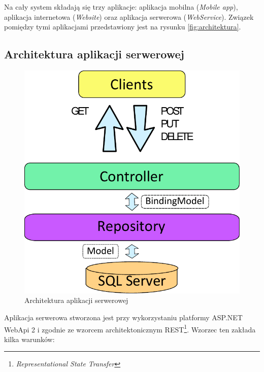 \documentclass{book}
\begin{document}
		Na cały system składają się trzy aplikacje: aplikacja mobilna (\emph{Mobile app}), aplikacja internetowa (\emph{Website}) oraz aplikacja serwerowa (\emph{WebService}). Związek pomiędzy tymi aplikacjami przedstawiony jest na rysunku \ref{fig:architektura}. 
			
			\subsection{Architektura aplikacji serwerowej}
			
			\begin{figure}
				\centering
				\includegraphics[width=1\textwidth]{images/architektura_server.pdf}
				\caption{Architektura aplikacji serwerowej}
				\label{fig:architektura_server}
			\end{figure}
			
			Aplikacja serwerowa stworzona jest przy wykorzystaniu platformy ASP.NET WebApi 2 i zgodnie ze wzorcem architektonicznym REST\footnote{\emph{Representational State Transfer}}. Wzorzec ten zakłada kilka warunków:
			
\end{document}
